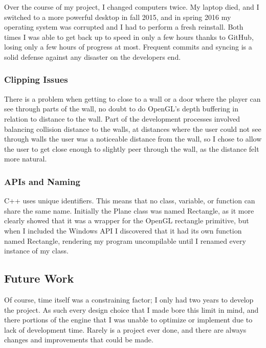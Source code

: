 \documentclass{article}
\begin{document}
Over the course of my project, I changed computers twice. My laptop died, and I switched to a more powerful desktop in fall 2015, and in spring 2016 my operating system was corrupted and I had to perform a fresh reinstall. Both times I was able to get back up to speed in only a few hours thanks to GitHub, losing only a few hours of progress at most. Frequent commits and syncing is a solid defense against any disaster on the developers end.

\subsubsection{Clipping Issues} \label{subsubsec:clipping}

There is a problem when getting to close to a wall or a door where the player can see through parts of the wall, no doubt to do OpenGL's depth buffering in relation to distance to the wall. Part of the development processes involved balancing collision distance to the walls, at distances where the user could not see through walls the user was a noticeable distance from the wall, so I chose to allow the user to get close enough to slightly peer through the wall, as the distance felt more natural.

\subsubsection{APIs and Naming} \label{subsubsec:naming}

C++ uses unique identifiers. This means that no class, variable, or function can share the same name. Initially the Plane class was named Rectangle, as it more clearly showed that it was a wrapper for the OpenGL rectangle primitive, but when I included the Windows API I discovered that it had its own function named Rectangle, rendering my program uncompilable until I renamed every instance of my class.

\subsection{Future Work} \label{subsec:future}

Of course, time itself was a constraining factor; I only had two years to develop the project. As such every design choice that I made bore this limit in mind, and there portions of the engine that I was unable to optimize or implement due to lack of development time. Rarely is a project ever done, and there are always changes and improvements that could be made.
\end{document}
